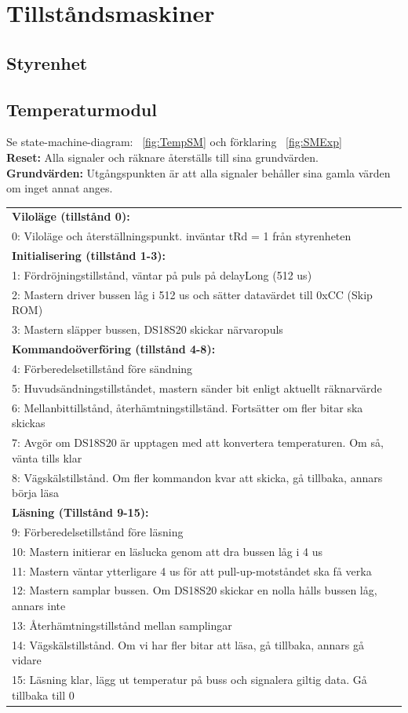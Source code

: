 \documentclass[a4paper,11pt]{article}
\begin{document}
\section{Tillståndsmaskiner}
\label{sec:Tillstandsmaskiner}		
\subsection{Styrenhet}
		\subsection{Temperaturmodul}
			Se state-machine-diagram: ~\ref{fig:TempSM} och förklaring ~\ref{fig:SMExp}\\
			{\bf Reset:} Alla signaler och räknare återställs till sina grundvärden.\\
			{\bf Grundvärden:} Utgångspunkten är att alla signaler behåller sina gamla värden om inget annat anges.\\
			\begin{tabular}{l}
				\\{\bf Viloläge (tillstånd 0):}\\
				0: Viloläge och återställningspunkt. inväntar tRd = 1 från styrenheten\\
				{\bf Initialisering (tillstånd 1-3):}\\
				1: Fördröjningstillstånd, väntar på puls på delayLong (512 us)\\
				2: Mastern driver bussen låg i 512 us och sätter datavärdet till 0xCC (Skip ROM)\\
				3: Mastern släpper bussen, DS18S20 skickar närvaropuls\\
				{\bf Kommandoöverföring (tillstånd 4-8):}\\
				4: Förberedelsetillstånd före sändning\\
				5: Huvudsändningstillståndet, mastern sänder bit enligt aktuellt räknarvärde\\
				6: Mellanbittillstånd, återhämtningstillständ. Fortsätter om fler bitar ska skickas\\
				7: Avgör om DS18S20 är upptagen med att konvertera temperaturen. Om så, vänta tills klar\\
				8: Vägskälstillstånd. Om fler kommandon kvar att skicka, gå tillbaka, annars börja läsa\\
				{\bf Läsning (Tillstånd 9-15):}\\
				9:  Förberedelsetillstånd före läsning\\
				10: Mastern initierar en läslucka genom att dra bussen låg i 4 us\\
				11: Mastern väntar ytterligare 4 us för att pull-up-motståndet ska få verka\\
				12: Mastern samplar bussen. Om DS18S20 skickar en nolla hålls bussen låg, annars inte\\
				13: Återhämtningstillstånd mellan samplingar\\
				14: Vägskälstillstånd. Om vi har fler bitar att läsa, gå tillbaka, annars gå vidare\\
				15: Läsning klar, lägg ut temperatur på buss och signalera giltig data. Gå tillbaka till 0\\
			\end{tabular}
\end{document}
